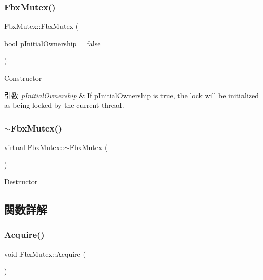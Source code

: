 \subsubsection{\texorpdfstring{Fbx\+Mutex()}{FbxMutex()}}
{\footnotesize\ttfamily Fbx\+Mutex\+::\+Fbx\+Mutex (\begin{DoxyParamCaption}\item[{bool}]{p\+Initial\+Ownership = {\ttfamily false} }\end{DoxyParamCaption})}

Constructor 
\begin{DoxyParams}{引数}
{\em p\+Initial\+Ownership} & If p\+Initial\+Ownership is true, the lock will be initialized as being locked by the current thread. \\
\hline
\end{DoxyParams}
\mbox{\label{class_fbx_mutex_a68eda93d02e2adc9f717d28208305aa6}} 
\subsubsection{\texorpdfstring{$\sim$\+Fbx\+Mutex()}{~FbxMutex()}}
{\footnotesize\ttfamily virtual Fbx\+Mutex\+::$\sim$\+Fbx\+Mutex (\begin{DoxyParamCaption}{ }\end{DoxyParamCaption})\hspace{0.3cm}{\ttfamily [virtual]}}



Destructor 



\subsection{関数詳解}
\mbox{\label{class_fbx_mutex_abca054ea52a16ade66050af56a04b97c}} 
\subsubsection{\texorpdfstring{Acquire()}{Acquire()}}
{\footnotesize\ttfamily void Fbx\+Mutex\+::\+Acquire (\begin{DoxyParamCaption}{ }\end{DoxyParamCaption})}

